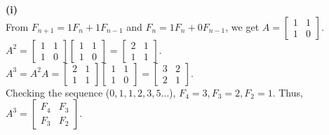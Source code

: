\begin{solution}
\textbf{(i)} \\
From $F_{n+1} = 1F_n + 1F_{n-1}$ and $F_n = 1F_n + 0F_{n-1}$, we get $A = \begin{bmatrix} 1 & 1 \\ 1 & 0 \end{bmatrix}$. \\
$A^2 = \begin{bmatrix} 1 & 1 \\ 1 & 0 \end{bmatrix} \begin{bmatrix} 1 & 1 \\ 1 & 0 \end{bmatrix} = \begin{bmatrix} 2 & 1 \\ 1 & 1 \end{bmatrix}$. \\
$A^3 = A^2 A = \begin{bmatrix} 2 & 1 \\ 1 & 1 \end{bmatrix} \begin{bmatrix} 1 & 1 \\ 1 & 0 \end{bmatrix} = \begin{bmatrix} 3 & 2 \\ 2 & 1 \end{bmatrix}$. \\
Checking the sequence ($0,1,1,2,3,5\dots$), $F_4=3, F_3=2, F_2=1$. Thus, $A^3 = \begin{bmatrix} F_4 & F_3 \\ F_3 & F_2 \end{bmatrix}$.


\end{solution}
